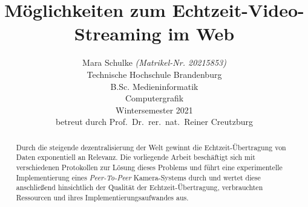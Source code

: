 \documentclass{article}
\title{Möglichkeiten zum Echtzeit-Video-Streaming im Web}
\author{
	\vspace{0.5em}
	Mara Schulke \textit{(Matrikel-Nr. 20215853)}\\
	\small{Technische Hochschule Brandenburg}\\
	\small{B.Sc. Medieninformatik}\\
	\small{Computergrafik}\\
	\small{Wintersemester 2021}\\
	\small{betreut durch Prof.\ Dr.\ rer.\ nat.\ Reiner Creutzburg}\\
}
\begin{document}
\begin{onecolumn}
	\begin{titlepage}


		\maketitle

		\begin{abstract}
			Durch die steigende dezentralisierung der Welt gewinnt die
			Echtzeit-Übertragung von Daten exponentiell an Relevanz. Die
			vorliegende Arbeit beschäftigt sich mit verschiedenen Protokollen
			zur Lösung dieses Problems und führt eine experimentelle
			Implementierung eines \textit{Peer-To-Peer} Kamera-Systems durch
			und wertet diese anschließend hinsichtlich der Qualität der
			Echtzeit-Übertragung, verbrauchten Ressourcen und ihres
			Implementierungsaufwandes aus.
		\end{abstract}

		\tableofcontents

		\listoffigures
	\end{titlepage}
\end{onecolumn}

\end{document}
